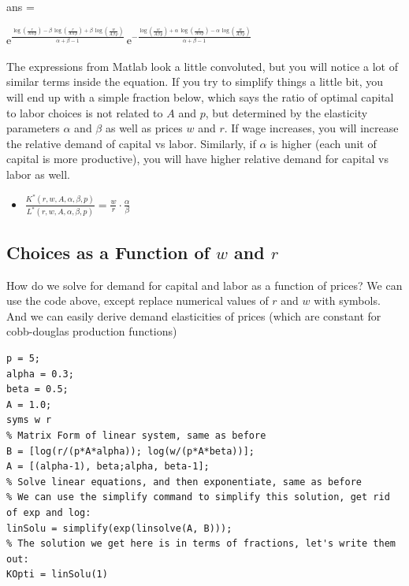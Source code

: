\documentclass[
]{book}
\providecommand{\tightlist}{%
  \setlength{\itemsep}{0pt}\setlength{\parskip}{0pt}}
\begin{document}
ans =

\(\displaystyle {\mathrm{e}}^{\frac{\log \left(\frac{r}{A\,\alpha \,p}\right)-\beta \,\log \left(\frac{r}{A\,\alpha \,p}\right)+\beta \,\log \left(\frac{w}{A\,\beta \,p}\right)}{\alpha +\beta -1}} \,{\mathrm{e}}^{-\frac{\log \left(\frac{w}{A\,\beta \,p}\right)+\alpha \,\log \left(\frac{r}{A\,\alpha \,p}\right)-\alpha \,\log \left(\frac{w}{A\,\beta \,p}\right)}{\alpha +\beta -1}}\)

The expressions from Matlab look a little convoluted, but you will
notice a lot of similar terms inside the equation. If you try to
simplify things a little bit, you will end up with a simple fraction
below, which says the ratio of optimal capital to labor choices is not
related to \(A\) and \(p\), but determined by the elasticity parameters
\(\alpha\) and \(\beta\) as well as prices \(w\) and \(r\). If wage increases,
you will increase the relative demand of capital vs labor. Similarly, if
\(\alpha\) is higher (each unit of capital is more productive), you will
have higher relative demand for capital vs labor as well.

\begin{itemize}
\tightlist
\item
  \(\displaystyle \frac{K^* (r,w,A,\alpha ,\beta ,p)}{L^* (r,w,A,\alpha ,\beta ,p)}=\frac{w}{r}\cdot \frac{\alpha }{\beta }\)
\end{itemize}

\hypertarget{choices-as-a-function-of-w-and-r}{%
\subsection{\texorpdfstring{Choices as a Function of \(w\) and \(r\)}{Choices as a Function of w and r}}\label{choices-as-a-function-of-w-and-r}}

How do we solve for demand for capital and labor as a function of
prices? We can use the code above, except replace numerical values of
\(r\) and \(w\) with symbols. And we can easily derive demand elasticities
of prices (which are constant for cobb-douglas production functions)

\begin{verbatim}
p = 5;
alpha = 0.3;
beta = 0.5;
A = 1.0;
syms w r
% Matrix Form of linear system, same as before
B = [log(r/(p*A*alpha)); log(w/(p*A*beta))];
A = [(alpha-1), beta;alpha, beta-1];
% Solve linear equations, and then exponentiate, same as before
% We can use the simplify command to simplify this solution, get rid of exp and log:
linSolu = simplify(exp(linsolve(A, B)));
% The solution we get here is in terms of fractions, let's write them out:
KOpti = linSolu(1)
\end{verbatim}
\end{document}
